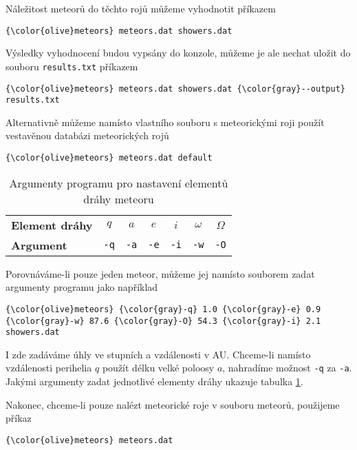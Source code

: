 Náležitost meteorů do těchto rojů můžeme vyhodnotit příkazem
\begin{Verbatim}[commandchars=\\\{\},gobble=4,formatcom=\small]
    {\color{olive}meteors} meteors.dat showers.dat
\end{Verbatim}
Výsledky vyhodnocení budou vypsány do konzole, můžeme je ale nechat uložit do souboru \texttt{results.txt} příkazem
\begin{Verbatim}[commandchars=\\\{\},gobble=4,formatcom=\small]
    {\color{olive}meteors} meteors.dat showers.dat {\color{gray}--output} results.txt
\end{Verbatim}
Alternativně můžeme namísto vlastního souboru s meteorickými roji použít vestavěnou databázi meteorických rojů
\begin{Verbatim}[commandchars=\\\{\},gobble=4,formatcom=\small]
    {\color{olive}meteors} meteors.dat default
\end{Verbatim}

\begin{table}[!h]
    \centering
    \caption{Argumenty programu pro nastavení elementů dráhy meteoru}
    \begin{tabular}[pos]{|l|cccccc|}
        \hline
        \textbf{Element dráhy} & $q$ & $a$ & $e$ & $i$ & $\omega$ & $\Omega$ \\
        \textbf{Argument} & \texttt{-q} & \texttt{-a} & \texttt{-e} & \texttt{-i} & \texttt{-w} & \texttt{-O} \\
        \hline
    \end{tabular}
    \label{tbl:practical:arguments}
\end{table}

Porovnáváme-li pouze jeden meteor, můžeme jej namísto souborem zadat argumenty programu jako například
\begin{Verbatim}[commandchars=\\\{\},gobble=4,formatcom=\small]
    {\color{olive}meteors} {\color{gray}-q} 1.0 {\color{gray}-e} 0.9 {\color{gray}-w} 87.6 {\color{gray}-O} 54.3 {\color{gray}-i} 2.1 showers.dat
\end{Verbatim}
I zde zadáváme úhly ve stupních a vzdálenosti v AU. Chceme-li namísto vzdálenosti perihelia $q$ použít délku velké poloosy $a$, nahradíme možnost \texttt{-q} za \texttt{-a}. Jakými argumenty zadat jednotlivé elementy dráhy ukazuje tabulka \ref{tbl:practical:arguments}.

Nakonec, chceme-li pouze nalézt meteorické roje v souboru meteorů, použijeme příkaz
\begin{Verbatim}[commandchars=\\\{\},gobble=4,formatcom=\small]
    {\color{olive}meteors} meteors.dat
\end{Verbatim}

